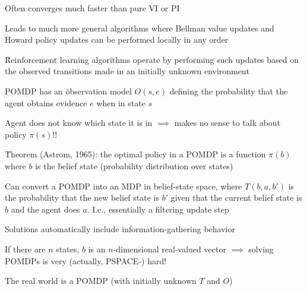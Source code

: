 \documentclass{article}
\begin{document}
\begin{huge}
Often converges much faster than pure VI or PI

Leads to much more general algorithms where Bellman value updates
and Howard policy updates can be performed locally in any order

\u{Reinforcement learning} algorithms operate by performing such
updates based on the observed transitions made in an initially unknown
environment


POMDP has an \u{observation model} $O(s,e)$ defining the probability that the
agent obtains evidence $e$ when in state $s$

Agent does not know which state it is in\nl
$\implies$ makes no sense to talk about policy $\pi(s)$!!

\u{Theorem} (Astrom, 1965): the optimal policy in a POMDP is a function\nl
  $\pi(b)$ where $b$ is the \u{belief state} (probability distribution over states)

Can convert a POMDP into an MDP in belief-state space, where\nl
  $T(b,a,b')$ is the probability that the new belief state is $b'$\nl
  given that the current belief state is $b$ and the agent does $a$.\nl
  I.e., essentially a filtering update step


Solutions automatically include information-gathering behavior

If there are $n$ states, $b$ is an $n$-dimensional real-valued vector\nl
$\implies$ solving POMDPs is very (actually, PSPACE-) hard!

The real world is a POMDP (with initially unknown $T$ and $O$)




\end{huge}
\end{document}
